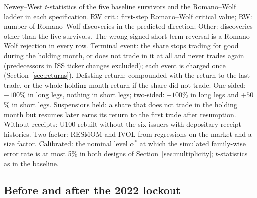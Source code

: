 \documentclass[11pt]{article}
\newcommand{\tabnote}[1]{\par\vspace{3pt}\begin{minipage}{\linewidth}\footnotesize\setstretch{1.0}#1\end{minipage}}
\newcommand{\RW}{Romano--Wolf}
\begin{document}
\begin{table}[!htbp]
\centering\small
\caption{Additional checks (exploratory)}\label{tab:revchecks}
\resizebox{\linewidth}{!}{}
\tabnote{Newey--West $t$-statistics of the five baseline survivors and the \RW{} ladder in each specification. RW crit.:
first-step \RW{} critical value; RW: number of \RW{} discoveries in the predicted direction; Other: discoveries other
than the five survivors. The wrong-signed short-term reversal is a \RW{} rejection in every row. Terminal event: the
share stops trading for good during the holding month, or does not trade in it at all and never trades again
(predecessors in ISS ticker changes excluded); each event is charged once (Section~\ref{sec:returns}). Delisting return: compounded with the return to the last trade, or the whole holding-month return
if the share did not trade. One-sided: $-100$\% in long legs, nothing in short legs; two-sided: $-100$\% in long legs
and $+50$\% in short legs. Suspensions held: a share that does
not trade in the holding month but resumes later earns its return to the first trade after resumption. Without
receipts: U100 rebuilt without the six issuers with depositary-receipt histories. Two-factor: RESMOM and IVOL from
regressions on the market and a size factor. Calibrated: the nominal level $\alpha^\ast$ at which the simulated
family-wise error rate is at most 5\% in both designs of Section~\ref{sec:multiplicity}; $t$-statistics as in the
baseline.}
\end{table}

\subsection{Before and after the 2022 lockout}
\end{document}

